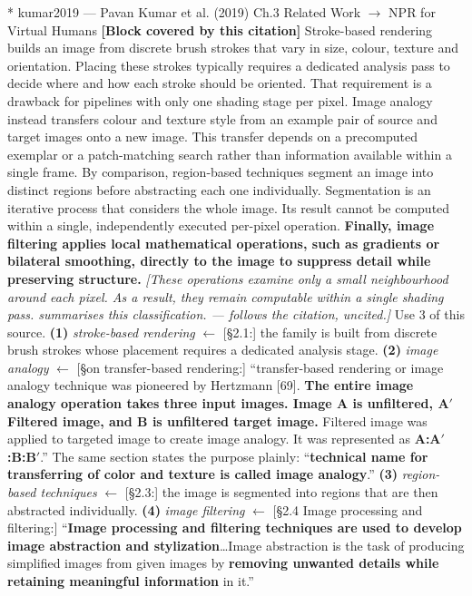 \documentclass[11pt, a4paper]{article}
\makeatletter
\newcounter{citentry}
\newcommand{\citentry@core}[7]{%
  \stepcounter{citentry}
  \begingroup
  \sbox{\citentry@measurebox}{%
    \begin{minipage}{\linewidth}
      \noindent\colorbox{konstanzblue}{\parbox{\dimexpr\linewidth-2\fboxsep}{%
        \vspace{3pt}
        \textbf{\#\thecitentry \quad #2} \hfill \textit{#3}
        \vspace{3pt}
      }}
      \vspace{3pt}
      \noindent\begin{tabular}{@{}p{2.7cm} p{\dimexpr\linewidth-3cm}@{}}
        \textit{\small Sentence in thesis:} & #4 \\[5pt]
        \textbf{Usage:}\hfill       & #5 \\[5pt]
        \textit{\small Original source:}     & #6 \\[5pt]
        \textbf{How to check:}             & #7 \\
      \end{tabular}
      \vspace{5pt}
      \rule{10pt}{10pt}\quad \textbf{Validated} --- I have read the original and agree it supports the sentence.
    \end{minipage}%
  }%
  \Needspace{\dimexpr\ht\citentry@measurebox+\dp\citentry@measurebox\relax}%
  \endgroup
  \vspace{10pt}
  \noindent\colorbox{konstanzblue}{\parbox{\dimexpr\linewidth-2\fboxsep}{%
    \vspace{3pt}
    \textcolor{white}{\textbf{\#\thecitentry \quad #2}} \hfill \textcolor{white}{\textit{#3}}
    \vspace{3pt}
  }}
  \vspace{3pt}
  \noindent\begin{tabular}{@{}p{2.7cm} p{\dimexpr\linewidth-3cm}@{}}
    \textit{\small Sentence in thesis:} & \textcolor{darkgreen}{#4} \\[5pt]
    \textbf{Usage:}\hfill       & #5 \\[5pt]
    \textit{\small Original source:}     & \textcolor{darkred}{#6} \\[5pt]
    \textbf{How to check:}             & #7 \\
  \end{tabular}
  \vspace{5pt}
  \noindent\CheckBox[name=verified\thecitentry, width=10pt, height=10pt, bordercolor={0 0 0}, borderwidth=0.75, backgroundcolor={1 1 1}#1]{}\quad \textbf{Validated} --- I have read the original and agree it supports the sentence.
  \vspace{3pt}
  \noindent\textcolor{midgray}{\rule{\linewidth}{0.4pt}}
}
\newcommand{\citentry}{\@ifstar{\citentry@core{, checked}}{\citentry@core{}}}
\makeatother
\begin{document}
\begin{Form}
\citentry*
  {kumar2019 --- Pavan Kumar et al. (2019)}
  {Ch.3 Related Work $\rightarrow$ NPR for Virtual Humans}
  {\textbf{[Block covered by this citation]} Stroke-based rendering builds an image from discrete brush strokes that vary in size, colour, texture and orientation. Placing these strokes typically requires a dedicated analysis pass to decide where and how each stroke should be oriented. That requirement is a drawback for pipelines with only one shading stage per pixel. Image analogy instead transfers colour and texture style from an example pair of source and target images onto a new image. This transfer depends on a precomputed exemplar or a patch-matching search rather than information available within a single frame. By comparison, region-based techniques segment an image into distinct regions before abstracting each one individually. Segmentation is an iterative process that considers the whole image. Its result cannot be computed within a single, independently executed per-pixel operation. \textbf{Finally, image filtering applies local mathematical operations, such as gradients or bilateral smoothing, directly to the image to suppress detail while preserving structure.} \emph{[These operations examine only a small neighbourhood around each pixel. As a result, they remain computable within a single shading pass. summarises this classification. --- follows the citation, uncited.]}}
  {Use 3 of this source.}
  {\textbf{(1)} \emph{stroke-based rendering} $\leftarrow$ [\S2.1:] the family is built from discrete brush strokes whose placement requires a dedicated analysis stage. \quad \textbf{(2)} \emph{image analogy} $\leftarrow$ [\S on transfer-based rendering:] ``transfer-based rendering or image analogy technique was pioneered by Hertzmann [69]. \textbf{The entire image analogy operation takes three input images. Image A is unfiltered, A$'$ Filtered image, and B is unfiltered target image.} Filtered image was applied to targeted image to create image analogy. It was represented as \textbf{A:A$'$:B:B$'$}.'' The same section states the purpose plainly: ``\textbf{technical name for transferring of color and texture is called image analogy}.'' \quad \textbf{(3)} \emph{region-based techniques} $\leftarrow$ [\S2.3:] the image is segmented into regions that are then abstracted individually. \quad \textbf{(4)} \emph{image filtering} $\leftarrow$ [\S2.4 Image processing and filtering:] ``\textbf{Image processing and filtering techniques are used to develop image abstraction and stylization}\ldots Image abstraction is the task of producing simplified images from given images by \textbf{removing unwanted details while retaining meaningful information} in it.''}

\end{Form}
\end{document}
